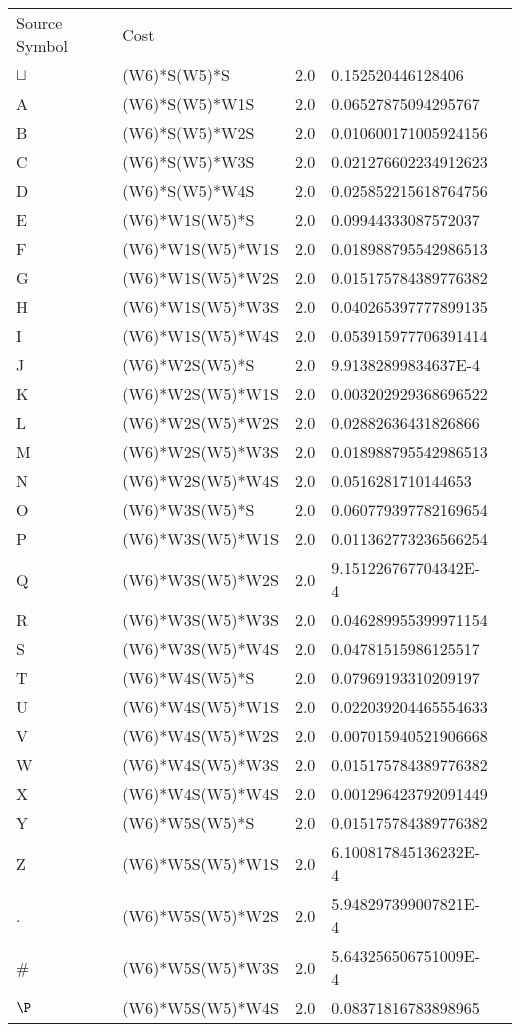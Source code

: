 \documentclass[12pt]{article}
\begin{document}
\begin{tabular}{l l l l l}
Source Symbol	&	Cost\\
$\sqcup$	&	(W{6})*S(W{5})*S	&	2.0	&	0.152520446128406\\
A	&	(W{6})*S(W{5})*W{1}S	&	2.0	&	0.06527875094295767\\
B	&	(W{6})*S(W{5})*W{2}S	&	2.0	&	0.010600171005924156\\
C	&	(W{6})*S(W{5})*W{3}S	&	2.0	&	0.021276602234912623\\
D	&	(W{6})*S(W{5})*W{4}S	&	2.0	&	0.025852215618764756\\
E	&	(W{6})*W{1}S(W{5})*S	&	2.0	&	0.09944333087572037\\
F	&	(W{6})*W{1}S(W{5})*W{1}S	&	2.0	&	0.018988795542986513\\
G	&	(W{6})*W{1}S(W{5})*W{2}S	&	2.0	&	0.015175784389776382\\
H	&	(W{6})*W{1}S(W{5})*W{3}S	&	2.0	&	0.040265397777899135\\
I	&	(W{6})*W{1}S(W{5})*W{4}S	&	2.0	&	0.053915977706391414\\
J	&	(W{6})*W{2}S(W{5})*S	&	2.0	&	9.91382899834637E-4\\
K	&	(W{6})*W{2}S(W{5})*W{1}S	&	2.0	&	0.003202929368696522\\
L	&	(W{6})*W{2}S(W{5})*W{2}S	&	2.0	&	0.02882636431826866\\
M	&	(W{6})*W{2}S(W{5})*W{3}S	&	2.0	&	0.018988795542986513\\
N	&	(W{6})*W{2}S(W{5})*W{4}S	&	2.0	&	0.0516281710144653\\
O	&	(W{6})*W{3}S(W{5})*S	&	2.0	&	0.060779397782169654\\
P	&	(W{6})*W{3}S(W{5})*W{1}S	&	2.0	&	0.011362773236566254\\
Q	&	(W{6})*W{3}S(W{5})*W{2}S	&	2.0	&	9.151226767704342E-4\\
R	&	(W{6})*W{3}S(W{5})*W{3}S	&	2.0	&	0.046289955399971154\\
S	&	(W{6})*W{3}S(W{5})*W{4}S	&	2.0	&	0.04781515986125517\\
T	&	(W{6})*W{4}S(W{5})*S	&	2.0	&	0.07969193310209197\\
U	&	(W{6})*W{4}S(W{5})*W{1}S	&	2.0	&	0.022039204465554633\\
V	&	(W{6})*W{4}S(W{5})*W{2}S	&	2.0	&	0.007015940521906668\\
W	&	(W{6})*W{4}S(W{5})*W{3}S	&	2.0	&	0.015175784389776382\\
X	&	(W{6})*W{4}S(W{5})*W{4}S	&	2.0	&	0.001296423792091449\\
Y	&	(W{6})*W{5}S(W{5})*S	&	2.0	&	0.015175784389776382\\
Z	&	(W{6})*W{5}S(W{5})*W{1}S	&	2.0	&	6.100817845136232E-4\\
.	&	(W{6})*W{5}S(W{5})*W{2}S	&	2.0	&	5.948297399007821E-4\\
\#	&	(W{6})*W{5}S(W{5})*W{3}S	&	2.0	&	5.643256506751009E-4\\
$\P$	&	(W{6})*W{5}S(W{5})*W{4}S	&	2.0	&	0.08371816783898965\\
\end{tabular}
\end{document}
